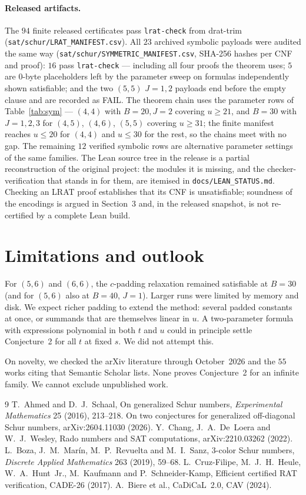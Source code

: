 \documentclass[11pt]{amsart}
\theoremstyle{definition}
\begin{document}
\paragraph{Released artifacts.} The $94$ finite released certificates
pass \texttt{lrat-check} from drat-trim
(\texttt{sat/schur/LRAT\_MANIFEST.csv}). All $23$ archived symbolic
payloads were audited the same way
(\texttt{sat/schur/SYMMETRIC\_MANIFEST.csv}, SHA-256 hashes per CNF
and proof): $16$ pass \texttt{lrat-check} — including all four
proofs the theorem uses; $5$ are $0$-byte placeholders left by the
parameter sweep on formulas independently shown satisfiable; and the
two $(5,5)$ $J=1,2$ payloads end before the empty clause and are
recorded as FAIL. The theorem chain uses the
parameter rows of Table~\ref{tab:sym} — $(4,4)$ with $B=20,J=2$
covering $u\ge21$, and $B=30$ with $J=1,2,3$ for $(4,5)$, $(4,6)$,
$(5,5)$ covering $u\ge31$; the finite manifest reaches $u\le20$ for
$(4,4)$ and $u\le30$ for the rest, so the chains meet with no gap.
The remaining $12$ verified symbolic rows are alternative parameter
settings of the same families. The Lean
source tree in the release is a partial reconstruction of the original
project: the modules it is missing, and the checker-verification that
stands in for them, are itemised in \texttt{docs/LEAN\_STATUS.md}.
Checking an LRAT proof establishes that its CNF is unsatisfiable;
soundness of the encodings is argued in Section~3 and, in the
released snapshot, is not re-certified by a complete Lean build.

\section{Limitations and outlook}

For $(5,6)$ and $(6,6)$, the $c$-padding relaxation remained
satisfiable at $B=30$ (and for $(5,6)$ also at $B=40$, $J=1$). Larger
runs were limited by memory and disk. We expect richer padding to
extend the method: several padded constants at once, or summands that
are themselves linear in $u$. A two-parameter formula with
expressions polynomial in both $t$ and $u$ could in principle settle
Conjecture~2 for all $t$ at fixed $s$. We did not attempt this.

On novelty, we checked the arXiv literature through October~2026 and
the $55$ works citing \cite{AS16} that Semantic Scholar lists. None
proves Conjecture~2 for an infinite family. We cannot exclude
unpublished work.

\begin{thebibliography}{9}
 T.~Ahmed and D.~J.~Schaal, On generalized Schur
numbers, \emph{Experimental Mathematics} 25 (2016), 213--218.
 On two conjectures for generalized off-diagonal Schur
numbers, arXiv:2604.11030 (2026).
 Y.~Chang, J.~A.~De~Loera and W.~J.~Wesley, Rado
numbers and SAT computations, arXiv:2210.03262 (2022).
 L.~Boza, J.~M.~Mar\'in, M.~P.~Revuelta and
M.~I.~Sanz, 3-color Schur numbers, \emph{Discrete Applied
Mathematics} 263 (2019), 59--68.
 L.~Cruz-Filipe, M.~J.~H.~Heule, W.~A.~Hunt~Jr.,
M.~Kaufmann and P.~Schneider-Kamp, Efficient certified RAT
verification, CADE-26 (2017).
 A.~Biere et al., CaDiCaL~2.0, CAV (2024).
\end{thebibliography}
\end{document}
